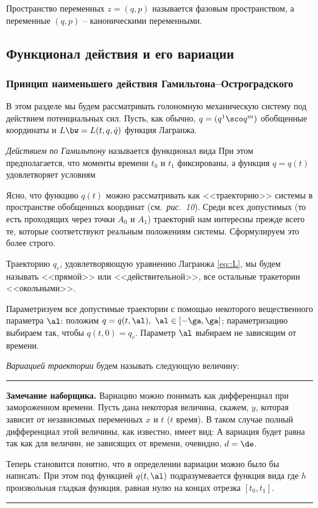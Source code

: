 \documentclass[a4paper,12pt]{article}
\newcommand{\tdf}[1]{\textsl{#1}}
\newcommand{\tpic}[1]{\emph{#1}}
\newenvironment{nbb}{\par\vskip3pt\hrule\vskip3pt\textbf{\footnotesize Замечание наборщика.}\footnotesize }
{\vskip3pt\hrule\par\vskip3pt}
\def\xtrpicturep#1#2{\vadjust{\vbox{%
\vskip.5pc
\centerline{\epsfbox{pictures.#1}}
\vskip2pt
\centerline{\footnotesize\normalfont\textbf{Рис.~#2}}
\vskip.5pc}}}
\begin{document}
\begin{note}
  Пространство переменных $z=(q,p)$ называется фазовым пространством,
  а переменные $(q,p)$ -- каноническими переменными.
\end{note}

\subsection{Функционал действия и его вариации}

\subsubsection{Принцип наименьшего действия Гамильтона--Остроградского}

В этом разделе мы будем рассматривать голономную механическую систему под действием потенциальных
сил. Пусть, как обычно, $q=(q^1\sco q^m)$ обобщенные координаты и $L\bw=L(t,q,\dot{q})$ функция
Лагранжа.
\begin{df}
\tdf{Действием по Гамильтону} называется функционал вида
 При этом предполагается, что
моменты времени $t_0$ и $t_1$ фиксированы, а функция $q=q(t)$ удовлетворяет условиям
\end{df}
Ясно, что функцию $q(t)$ можно рассматривать как <<траекторию>> системы в пространстве обобщенных
координат (см.~\tpic{рис.~10}). \xtrpicturep{10}{10} Среди всех допустимых (то есть проходящих через точки
$A_0$ и $A_1$) траекторий нам интересны прежде всего те, которые соответствуют реальным положениям
системы. Сформулируем это более строго.
\begin{df}
Траекторию $q_r$, удовлетворяющую уравнению Лагранжа \eqref{eq::L}, мы будем называть <<прямой>> или
<<действительной>>, все остальные тракетории <<окольными>>.
\end{df}
Параметризуем все допустимые траектории с помощью некоторого вещественного параметра $\al$: положим
$q=q(t,\al),\ \al\in[-\ga,\ga]$; параметризацию выбираем так, чтобы $q(t,0)=q_r$. Параметр $\al$ выбираем
не зависящим от времени.
\begin{df}
\tdf{Вариацией траектории} будем называть следующую величину:
\end{df}
\begin{nbb}
Вариацию можно понимать как дифференциал при замороженном времени.
Пусть дана некоторая величина, скажем, $y$,
которая зависит от независимых переменных $x$ и $t$ ($t$ время).
В таком случае полный дифференциал этой величины, как известно, имеет вид:
А вариация будет равна
так как для величин, не зависящих от времени, очевидно, $d=\de$.


Теперь становится понятно, что в определении вариации можно было бы написать:
При этом под функцией $q(t,\al)$ подразумевается функция вида
где $h$ произвольная гладкая функция, равная нулю на концах отрезка $[t_0,t_1]$.

\end{nbb}
\end{document}
